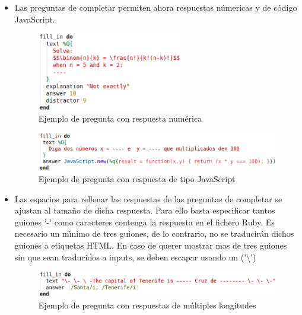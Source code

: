 \begin{itemize}
  \item Las preguntas de completar permiten ahora respuestas n\'umericas y de c\'odigo JavaScript.
  \begin{figure}[!th]
  \begin{center}
  \includegraphics[width=0.6\textwidth]{images/numeric_answer.eps}
  \caption{Ejemplo de pregunta con respuesta num\'erica}
  \label{fig:numeric_answer}
  \end{center}
  \end{figure}
  
  \begin{figure}[!th]
  \begin{center}
  \includegraphics[width=1\textwidth]{images/javascript_answer.eps}
  \caption{Ejemplo de pregunta con respuesta de tipo JavaScript}
  \label{fig:javascript_answer}
  \end{center}
  \end{figure}
  
  \item Las espacios para rellenar las respuestas de las preguntas de completar se ajustan al tama\~{n}o de dicha respuesta.
  Para ello basta especificar tantos guiones '-' como caracteres contenga la respuesta en el fichero Ruby. Es necesario un m\'{\i}nimo
  de tres guiones, de lo contrario, no se traducir\'an dichos guiones a etiquetas  HTML.
  En caso de querer mostrar mas de tres guiones sin que sean traducidos a inputs, se deben escapar usando un  ('\textbackslash')
  \begin{figure}[!th]
  \begin{center}
  \includegraphics[width=1\textwidth]{images/input.eps}
  \caption{Ejemplo de pregunta con respuestas de m\'ultiples longitudes}
  \label{fig:input}
  \end{center}
  \end{figure}
  \newpage
  

\end{itemize}
